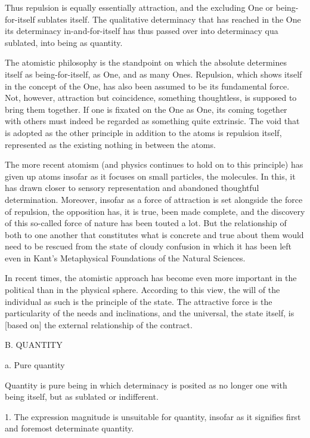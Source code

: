 Thus repulsion is equally essentially attraction, and
the excluding One or being-for-itself sublates itself.
The qualitative determinacy that has reached in the One
its determinacy in-and-for-itself
has thus passed over into determinacy qua sublated,
into being as quantity.

    The atomistic philosophy is the standpoint on which the absolute
    determines itself as being-for-itself, as One, and as many Ones.
    Repulsion, which shows itself in the concept of the One, has also
    been assumed to be its fundamental force.
    Not, however, attraction but coincidence, something thoughtless, is
    supposed to bring them together.
    If one is fixated on the One as One,
    its coming together with others must
    indeed be regarded as something quite extrinsic.
    The void that is adopted as the other principle
    in addition to the atoms is repulsion itself,
    represented as the existing nothing in between the atoms.

    The more recent atomism (and physics continues to hold on to this principle)
    has given up atoms insofar as it focuses on small particles, the molecules.
    In this, it has drawn closer to sensory representation and
    abandoned thoughtful determination.
    Moreover, insofar as a force of attraction is set alongside
    the force of repulsion, the opposition has, it is true,
    been made complete, and the discovery of this so-called
    force of nature has been touted a lot.
    But the relationship of both to one another that
    constitutes what is concrete and true about them would need to be
    rescued from the state of cloudy confusion in which it has been left
    even in Kant's Metaphysical Foundations of the Natural Sciences.

    In recent times, the atomistic approach has become even more important
    in the political than in the physical sphere.
    According to this view, the will of the individual as such is
    the principle of the state.
    The attractive force is the particularity of the needs and inclinations,
    and the universal, the state itself, is [based on]
    the external relationship of the contract.

B. QUANTITY

a. Pure quantity

Quantity is pure being in which determinacy is posited as
no longer one with being itself, but as sublated or indifferent.

    1. The expression magnitude is unsuitable for quantity,
    insofar as it signifies first and foremost determinate quantity.

